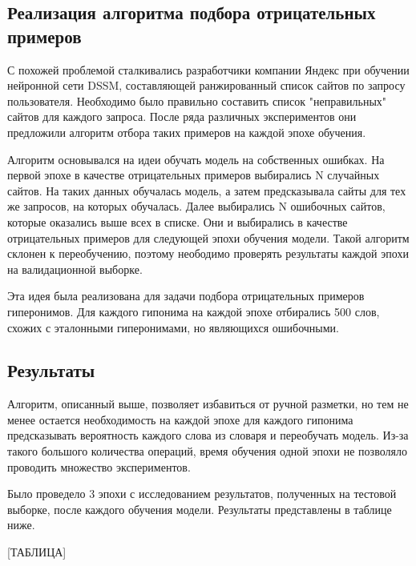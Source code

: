 \subsection{Реализация алгоритма подбора отрицательных примеров}

С похожей проблемой сталкивались разработчики компании Яндекс при обучении нейронной сети DSSM, составляющей ранжированный список сайтов по запросу пользователя. Необходимо было правильно составить список "неправильных" сайтов для каждого запроса. После ряда различных экспериментов они предложили алгоритм отбора таких примеров на каждой эпохе обучения. 

Алгоритм основывался на идеи обучать модель на собственных ошибках. На первой эпохе в качестве отрицательных примеров выбирались N случайных сайтов. На таких данных обучалась модель, а затем предсказывала сайты для тех же запросов, на которых обучалась. Далее выбирались N ошибочных сайтов, которые оказались выше всех в списке. Они и выбирались в качестве отрицательных примеров для следующей эпохи обучения модели. Такой алгоритм склонен к переобучению, поэтому неободимо проверять результаты каждой эпохи на валидационной выборке. 

Эта идея была реализована для задачи подбора отрицательных примеров гиперонимов. Для каждого гипонима на каждой эпохе отбирались 500 слов, схожих с эталонными гиперонимами, но являющихся ошибочными.

\subsection{Результаты}

Алгоритм, описанный выше, позволяет избавиться от ручной разметки, но тем не менее остается необходимость на каждой эпохе для каждого гипонима предсказывать вероятность каждого слова из словаря и переобучать модель. Из-за такого большого количества операций, время обучения одной эпохи не позволяло проводить множество экспериментов. 

Было проведело 3 эпохи с исследованием результатов, полученных на тестовой выборке, после каждого обучения модели. Результаты представлены в таблице ниже.

[ТАБЛИЦА]

